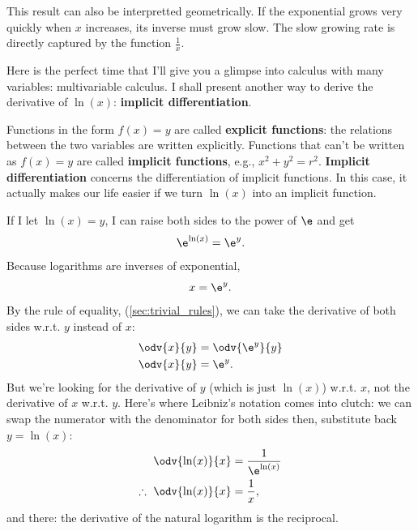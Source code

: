This result can also be interpretted geometrically. If the exponential grows very quickly when $x$ increases, its inverse must grow slow. The slow growing rate is directly captured by the function $\frac{1}{x}$.

Here is the perfect time that I'll give you a glimpse into calculus with many variables: multivariable calculus. I shall present another way to derive the derivative of $\ln(x)$: \textbf{implicit differentiation}.

Functions in the form $f(x) = y$ are called \textbf{explicit functions}: the relations between the two variables are written explicitly. Functions that can't be written as $f(x) = y$ are called \textbf{implicit functions}, e.g., $x^2 + y^2 = r^2$. \textbf{Implicit differentiation} concerns the differentiation of implicit functions. In this case, it actually makes our life easier if we turn $\ln(x)$ into an implicit function.

If I let $\ln(x) = y$, I can raise both sides to the power of $\e$ and get
\begin{equation}
	\e^{\ln(x)} = \e^y.
\end{equation}
Because logarithms are inverses of exponential,
\begin{equation}
	x = \e^y.
\end{equation}
By the rule of equality, (\cref{sec:trivial_rules}), we can take the derivative of both sides w.r.t. $y$ instead of $x$:
\begin{align*}
	\odv{x}{y} & = \odv{\e^y}{y} \\
	\odv{x}{y} & = \e^y.
\end{align*}
But we're looking for the derivative of $y$ (which is just $\ln(x)$) w.r.t. $x$, not the derivative of $x$ w.r.t. $y$. Here's where Leibniz's notation comes into clutch: we can swap the numerator with the denominator for both sides then, substitute back $y = \ln(x)$:
\begin{align*}
	\odv{\ln(x)}{x}            & = \frac{1}{\e^{\ln(x)}} \\
	\therefore~\odv{\ln(x)}{x} & = \frac{1}{x},
\end{align*}
and there: the derivative of the natural logarithm is the reciprocal.

